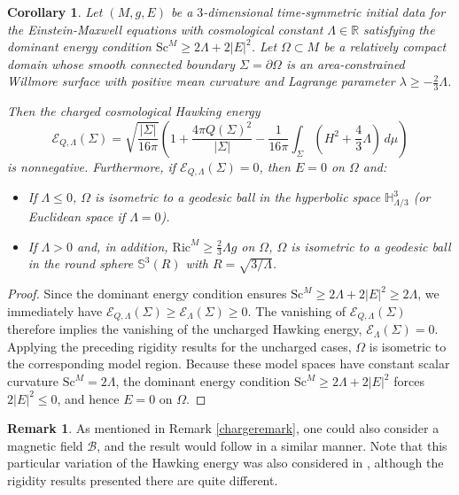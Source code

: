 \documentclass[12pt,a4paper]{amsart}
\theoremstyle{plain}
\newtheorem{corollary}[theorem]{Corollary}
\theoremstyle{definition}
\newtheorem{remark}[theorem]{Remark}
\begin{document}
\begin{corollary}
    Let $(M,g,E)$ be a $3$-dimensional time-symmetric initial data for the Einstein-Maxwell equations with cosmological constant $\Lambda \in \mathbb{R}$ satisfying the dominant energy condition $\mathrm{Sc}^M \ge 2 \Lambda +2|E|^2$. Let $\Omega \subset M$ be a relatively compact domain whose smooth connected boundary $\Sigma = \partial \Omega$ is an area-constrained Willmore surface with positive mean curvature and Lagrange parameter $\lambda \ge -\frac{2}{3}\Lambda$. 
    
    Then the charged cosmological Hawking energy 
    \begin{equation}
        \mathcal{E}_{Q, \Lambda}(\Sigma) = \sqrt{\frac{|\Sigma|}{16\pi}} 
        \left( 
        1 + \frac{4\pi Q(\Sigma)^2}{|\Sigma|}  
        - \frac{1}{16\pi} \int_{\Sigma} \left( H^2 + \frac{4}{3} \Lambda \right) \, d\mu 
        \right)
    \end{equation}
    is nonnegative. Furthermore, if $\mathcal{E}_{Q, \Lambda}(\Sigma) = 0$, then $E=0$ on $\Omega$ and:
    \begin{itemize}
        \item[i)] If $\Lambda \le 0$, $\Omega$ is isometric to a geodesic ball in the hyperbolic space $\mathbb{H}^3_{\Lambda/3}$ (or Euclidean space if $\Lambda=0$).
        \item[ii)] If $\Lambda>0$ and, in addition, $\mathrm{Ric}^M\ge \frac{2}{3}\Lambda g$ on $\Omega$, $\Omega$ is isometric to a geodesic ball in the round sphere $\mathbb{S}^3(R)$ with $R = \sqrt{3/\Lambda}$.
    \end{itemize}
\end{corollary}
\begin{proof}
    Since the dominant energy condition ensures $\mathrm{Sc}^M \ge 2 \Lambda + 2|E|^2 \ge 2 \Lambda$, we immediately have $\mathcal{E}_{Q, \Lambda}(\Sigma) \ge \mathcal{E}_{\Lambda}(\Sigma) \ge 0$. The vanishing of $\mathcal{E}_{Q, \Lambda}(\Sigma)$ therefore implies the vanishing of the uncharged Hawking energy, $\mathcal{E}_{\Lambda}(\Sigma) = 0$. Applying the preceding rigidity results for the uncharged cases, $\Omega$ is isometric to the corresponding model region. Because these model spaces have constant scalar curvature $\mathrm{Sc}^M = 2\Lambda$, the dominant energy condition $\mathrm{Sc}^M \ge 2 \Lambda + 2|E|^2$ forces $2|E|^2 \le 0$, and hence $E=0$ on $\Omega$.
\end{proof}

\begin{remark}
    As mentioned in Remark \ref{chargeremark}, one could also consider a magnetic field $\mathcal{B}$, and the result would follow in a similar manner. Note that this particular variation of the Hawking energy was also considered in \cite{baltazar2023local, leandro2025sharp, sousa2023charged}, although the rigidity results presented there are quite different.
\end{remark}
\end{document}
